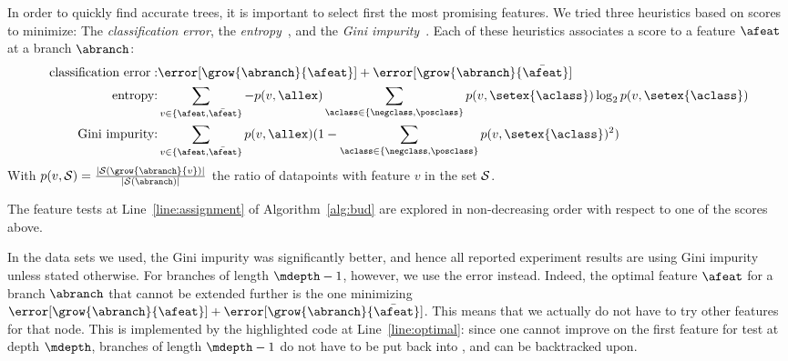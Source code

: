 \documentclass{article}
\begin{document}
In order to quickly find accurate trees, it is important to select first the most promising features. We tried three heuristics based on scores to minimize: The \emph{classification error}, the \emph{entropy}~\cite{10.1023/A:1022643204877}, and the \emph{Gini impurity}~\cite{breiman1984classification}. 
Each of these heuristics associates a score to a feature $\afeat$ at a branch $\abranch$:
\begin{eqnarray}
	\textrm{classification error}: & \error[\grow{\abranch}{\afeat}] + \error[\grow{\abranch}{\bar{\afeat}}] \\
	\textrm{entropy:} & \sum\limits_{v \in \{\afeat,\bar{\afeat}\}} -p(v,\allex) \sum\limits_{\aclass \in \{\negclass,\posclass\}} p(v,\setex{\aclass}) \log_{2} p(v,\setex{\aclass}) \\
	\textrm{Gini impurity:} &  \sum\limits_{v \in \{\afeat,\bar{\afeat}\}} p(v,\allex)(1 - \sum\limits_{\aclass \in \{\negclass,\posclass\}} p(v,\setex{\aclass})^2)
\end{eqnarray}
With $p(v,{\cal S}) = \frac{|{\cal S}(\grow{\abranch}{v})|}{|{\cal S}(\abranch)|}$ the ratio of datapoints with feature $v$ in the set ${\cal S}$.

The feature tests at Line~\ref{line:assignment} of Algorithm~\ref{alg:bud} are explored in non-decreasing order with respect to one of the scores above.


In the data sets we used, the Gini impurity was significantly better, and hence all reported experiment results are using Gini impurity unless stated otherwise. For branches of length $\mdepth-1$, however, we use the error instead. Indeed, the optimal feature $\afeat$ for a branch $\abranch$ that cannot be extended further is the one minimizing 
$\error[\grow{\abranch}{\afeat}] + \error[\grow{\abranch}{\bar{\afeat}}]$.
This means that we actually do not have to try other features for that node. This is implemented by the highlighted code at Line~\ref{line:optimal}: since one cannot improve on the first feature for test at depth $\mdepth$, branches of length $\mdepth-1$ do not have to be put back into \bud, and can be backtracked upon.
\end{document}
